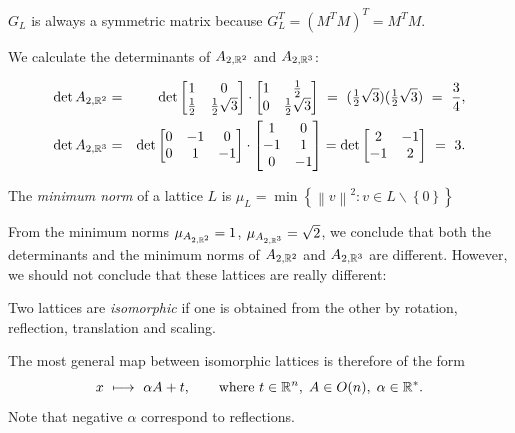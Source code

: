 \begin{observation}
 $G_L$ is always a symmetric matrix because $G_L^{T}=\left(M^{T}M\right)^{T}=M^{T}M$.
\end{observation}


We calculate the determinants of $A_{2,\mathbb{R}^{2}}$ and $A_{2,\mathbb{R}^{3}}$:

\begin{eqnarray*}
  \det A_{2,\RR^{2}}
  &=&
  \det \begin{bmatrix}
      1 & 0 \\
      \tfrac12 & \tfrac12\sqrt{3} \end{bmatrix}\cdot\begin{bmatrix}
      1 & \tfrac12 \\
      0 & \tfrac12\sqrt{3} \end{bmatrix}
    \ = \ 
    (\tfrac12\sqrt{3})(\tfrac12\sqrt{3})
  \ = \ 
  \frac34,
  \\
  \det A_{2,\RR^{3}}
  &=&
  \det \begin{bmatrix}
      0 & -1 & 0 \\
      0 & 1 & -1\end{bmatrix}\cdot\begin{bmatrix}
      1 & 0 \\
      -1 & 1 \\
      0 & -1 \end{bmatrix}=\det \begin{bmatrix}
      2 & -1 \\
      -1 & 2 \end{bmatrix}
  \ = \
  3.
\end{eqnarray*}

\begin{definition}
The \emph{minimum norm} of a lattice $L$ is $\mu_L=\min\left\{\left\|v\right\|^{2}:v\in L\backslash \left\{0\right\}\right\}$
\end{definition}

From the minimum norms $\mu_{A_{2,\mathbb{R}^{2}}} = 1$, $\mu_{A_{2,\mathbb{R}^{3}}} = \sqrt{2}$, we
conclude that both the determinants and the minimum norms of $A_{2,\mathbb{R}^{2}}$ and
$A_{2,\mathbb{R}^{3}}$ are different. However, we should not conclude that these lattices are
really different:


\begin{definition}
Two lattices are \emph{isomorphic} if one is obtained from the other by rotation, reflection, translation and scaling.
\end{definition}

The most general map between isomorphic lattices is therefore of the form
\[
   x\ \longmapsto \ \alpha A+t, \qquad\text{where }
   t\in\mathbb{R}^{n},\; A\in O(n),\; \alpha\in\mathbb{R}^{*}.
\]
Note that negative $\alpha$ correspond to reflections.

